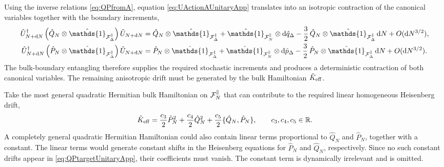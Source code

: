 \documentclass{article}
\def\cF{{\cal F}}
\newcommand{\openone}{\hat{\mathds{1}}}
\numberwithin{equation}{section}
\begin{document}
	Using the inverse relations \cref{eq:QPfromA}, equation \cref{eq:UActionAUnitaryApp} translates into an isotropic contraction of the canonical variables together with the boundary increments,
	\begin{align}
		\hat U_{N+\dd N}^\dagger \left( \hat Q_N\otimes\openone_{\cF_\Delta^\parallel} \right) \hat U_{N+\dd N} &= \hat Q_N\otimes\openone_{\cF_\Delta^\parallel} + \openone_{\cF_N^\parallel}\otimes \dd\hat q_\Delta - \frac32\,\hat Q_N\otimes\openone_{\cF_\Delta^\parallel}\,\dd N + O(\dd N^{3/2}), \nonumber\\ \hat U_{N+\dd N}^\dagger \left( \hat P_N\otimes\openone_{\cF_\Delta^\parallel} \right) \hat U_{N+\dd N} &= \hat P_N\otimes\openone_{\cF_\Delta^\parallel} + \openone_{\cF_N^\parallel}\otimes \dd\hat p_\Delta - \frac32\,\hat P_N\otimes\openone_{\cF_\Delta^\parallel}\,\dd N + O(\dd N^{3/2}).
		\label{eq:UActionQPUnitaryApp}
	\end{align}
	The bulk-boundary entangling therefore supplies the required stochastic increments and produces a deterministic contraction of both canonical variables. The remaining anisotropic drift must be generated by the bulk Hamiltonian \(\hat K_{\rm eff}\).

	Take the most general quadratic Hermitian bulk Hamiltonian on \(\cF_N^\parallel\) that can contribute to the required linear homogeneous Heisenberg drift,
	\begin{equation}
		\hat K_{\rm eff} = \frac{c_3}{2}\hat P_N^2 + \frac{c_4}{2}\hat Q_N^2 + \frac{c_5}{2}\{\hat Q_N,\hat P_N\}, \qquad c_3,c_4,c_5\in\mathbb R.
		\label{eq:KeffGeneralUnitaryApp}
	\end{equation}
	A completely general quadratic Hermitian Hamiltonian could also contain linear terms proportional to \(\hat Q_N\) and \(\hat P_N\), together with a constant. The linear terms would generate constant shifts in the Heisenberg equations for \(\hat P_N\) and \(\hat Q_N\), respectively. Since no such constant drifts appear in \cref{eq:QPtargetUnitaryApp}, their coefficients must vanish. The constant term is dynamically irrelevant and is omitted.
\end{document}
